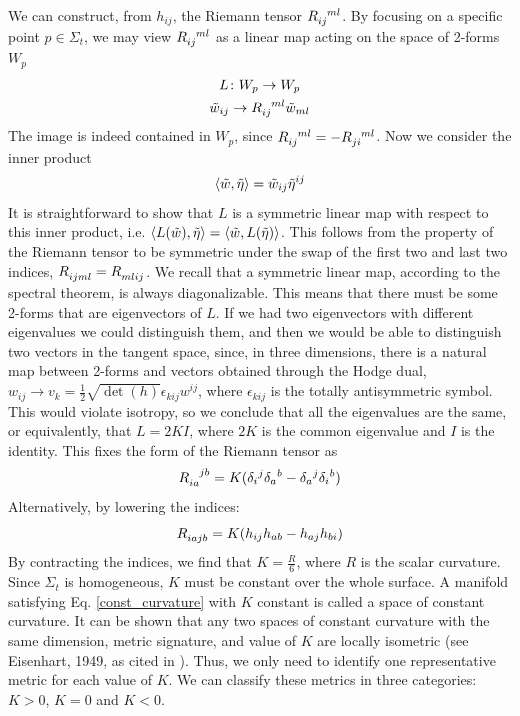 \documentclass[12pt,letterpaper]{article}         %
\newcommand\para{\paragraph{}}
\begin{document}
\para
We can construct, from $h_{ij}$, the Riemann tensor $\tensor{R}{_{ij}^{ml}}$. By focusing on a specific point $p \in \Sigma_t$, we may view $\tensor{R}{_{ij}^{ml}}$ as a linear map acting on the space of 2-forms $W_p$
\[
\begin{gathered}
L \colon W_p \to W_p \\
\tilde{w}_{ij} \to \tensor{R}{_{ij}^{ml}} \tilde{w}_{ml} 
\end{gathered}
\]
The image is indeed contained in $W_p$, since $\tensor{R}{_{ij}^{ml}} = -\tensor{R}{_{ji}^{ml}}$. Now we consider the inner product
\[
\braket{\tilde{w}, \tilde{\eta}} = \tilde{w}_{ij}\tilde{\eta}^{ij}
\]
It is straightforward to show that $L$ is a symmetric linear map with respect to this inner product, i.e. $\braket{L(\tilde{w}), \tilde{\eta}} = \braket{\tilde{w}, L(\tilde{\eta})}$. This follows from the property of the Riemann tensor to be symmetric under the swap of the first two and last two indices, $\tensor{R}{_{ij}_{ml}} = \tensor{R}{_{ml}_{ij}}$. We recall that a symmetric linear map, according to the spectral theorem, is always diagonalizable. This means that there must be some 2-forms that are eigenvectors of $L$. 
If we had two eigenvectors with different
eigenvalues we could distinguish them, 
and then we would be able to distinguish two vectors in the tangent space, since, in three dimensions, there is a natural map between 2-forms and vectors obtained through the Hodge dual, $w_{ij} \to v_k= \frac{1}{2} \sqrt{\det(h)} \epsilon_{kij}w^{ij}$, where $\epsilon_{kij}$ is the totally antisymmetric symbol.
This would violate isotropy, so we conclude that all the eigenvalues are the same, or equivalently, that $L = 2K I$, where $2K$ is the common eigenvalue and $I$ is the identity. This fixes the form of the Riemann tensor as
\[
\tensor{R}{_{ia}^{jb}} = K(\delta_i{}^j\delta_a{}^b-\delta_a{}^j\delta_i{}^b)
\]
Alternatively, by lowering the indices:
\begin{equation}
\tensor{R}{_{ia}_{jb}} = K(h_{ij}h_{ab}-h_{aj}h_{bi})
\label{const_curvature}
\end{equation}
By contracting the indices, we find that $K = \frac{R}{6}$, where $R$ is the scalar curvature. Since $\Sigma_t$ is homogeneous, $K$ must be constant over the whole surface. A manifold satisfying Eq. \eqref{const_curvature} with $K$ constant is called a space of constant curvature. It can be shown that 
any two spaces of constant curvature with the same dimension, metric signature, and value of $K$ are locally isometric (see Eisenhart, 1949, as cited in \cite{wald-relativity}). Thus, we only need to identify one representative metric for each value of $K$. We can classify these metrics in three categories: $K >0$, $K = 0$ and $K<0$.
\end{document}
